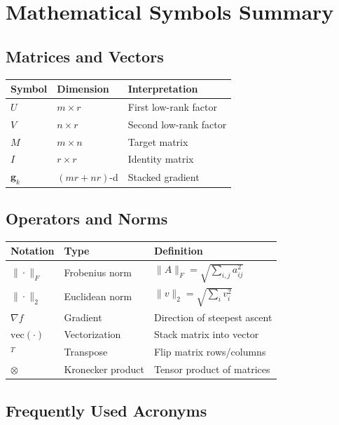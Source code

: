 \documentclass[11pt,oneside]{article}
\newcommand{\grad}{\nabla}
\begin{document}
\appendix

\section{Mathematical Symbols Summary}\label{app:symbols}

\subsection*{Matrices and Vectors}

\begin{tabularx}{\textwidth}{llX}
\toprule
\textbf{Symbol} & \textbf{Dimension} & \textbf{Interpretation} \\
\midrule
$U$ & $m \times r$ & First low-rank factor \\
$V$ & $n \times r$ & Second low-rank factor \\
$M$ & $m \times n$ & Target matrix \\
$I$ & $r \times r$ & Identity matrix \\
$\mathbf{g}_k$ & $(mr+nr)$-d & Stacked gradient \\
\bottomrule
\end{tabularx}

\subsection*{Operators and Norms}

\begin{tabularx}{\textwidth}{llX}
\toprule
\textbf{Notation} & \textbf{Type} & \textbf{Definition} \\
\midrule
$\|\cdot\|_F$ & Frobenius norm & $\|A\|_F = \sqrt{\sum_{i,j} a_{ij}^2}$ \\
$\|\cdot\|_2$ & Euclidean norm & $\|v\|_2 = \sqrt{\sum_i v_i^2}$ \\
$\grad f$ & Gradient & Direction of steepest ascent \\
$\text{vec}(\cdot)$ & Vectorization & Stack matrix into vector \\
$^T$ & Transpose & Flip matrix rows/columns \\
$\otimes$ & Kronecker product & Tensor product of matrices \\
\bottomrule
\end{tabularx}

\subsection*{Frequently Used Acronyms}
\end{document}
